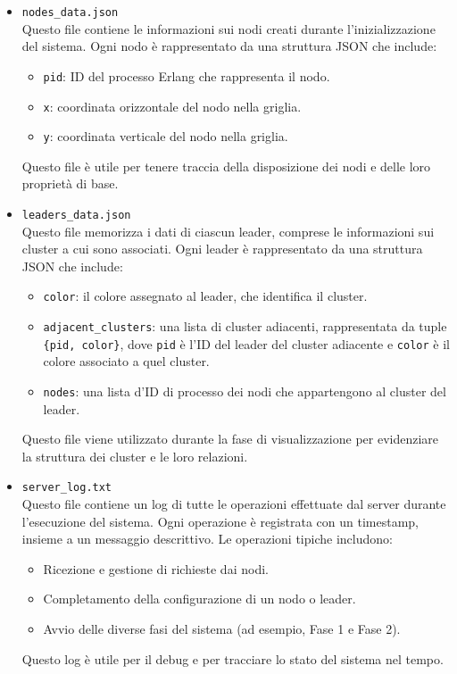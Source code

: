 \documentclass[12pt, a4paper]{report}
\begin{document}
\begin{itemize}
    \item \texttt{nodes\_data.json} \\
    Questo file contiene le informazioni sui nodi creati durante l'inizializzazione del sistema. Ogni nodo è rappresentato da una struttura JSON che include:
    \begin{itemize}
        \item \texttt{pid}: ID del processo Erlang che rappresenta il nodo.
        \item \texttt{x}: coordinata orizzontale del nodo nella griglia.
        \item \texttt{y}: coordinata verticale del nodo nella griglia.
    \end{itemize}
    Questo file è utile per tenere traccia della disposizione dei nodi e delle loro proprietà di base.

    \item \texttt{leaders\_data.json} \\
    Questo file memorizza i dati di ciascun leader, comprese le informazioni sui cluster a cui sono associati. Ogni leader è rappresentato da una struttura JSON che include:
    \begin{itemize}
        \item \texttt{color}: il colore assegnato al leader, che identifica il cluster.
        \item \texttt{adjacent\_clusters}: una lista di cluster adiacenti, rappresentata da tuple \texttt{\{pid, color\}}, dove \texttt{pid} \`e l'ID del leader del cluster adiacente e \texttt{color} \`e il colore associato a quel cluster.
        \item \texttt{nodes}: una lista d'ID di processo dei nodi che appartengono al cluster del leader.
    \end{itemize}
    Questo file viene utilizzato durante la fase di visualizzazione per evidenziare la struttura dei cluster e le loro relazioni.

    \item \texttt{server\_log.txt} \\
    Questo file contiene un log di tutte le operazioni effettuate dal server durante l'esecuzione del sistema. Ogni operazione è registrata con un timestamp, insieme a un messaggio descrittivo. Le operazioni tipiche includono:
    \begin{itemize}
        \item Ricezione e gestione di richieste dai nodi.
        \item Completamento della configurazione di un nodo o leader.
        \item Avvio delle diverse fasi del sistema (ad esempio, Fase 1 e Fase 2).
    \end{itemize}
    Questo log è utile per il debug e per tracciare lo stato del sistema nel tempo.


\end{itemize}
\end{document}
